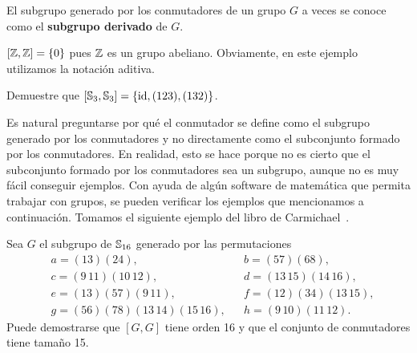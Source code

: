 El subgrupo generado por los conmutadores de un grupo $G$ a veces se conoce como el \textbf{subgrupo derivado} de $G$. 

\begin{example}
	$[\mathbb{Z},\mathbb{Z}]=\{0\}$ pues $\mathbb{Z}$ es un grupo abeliano. Obviamente, en este ejemplo
	utilizamos la notación aditiva. 
\end{example}

\begin{exercise}
	Demuestre que $[\mathbb{S}_3,\mathbb{S}_3]=\{\operatorname{id},(123),(132)\}$. 
\end{exercise}


Es natural preguntarse por qué el conmutador se define como el subgrupo
generado por los conmutadores y no directamente como el subconjunto formado por los conmutadores. En realidad, esto se hace porque no es cierto que el subconjunto formado por los conmutadores sea un subgrupo, aunque no es muy fácil conseguir ejemplos. Con ayuda de algún software de matemática que permita trabajar con grupos, se pueden verificar
los ejemplos que mencionamos a continuación. Tomamos el siguiente ejemplo del libro de Carmichael~\cite{MR0075938}.
	
\begin{example}
	Sea $G$ el subgrupo de $\mathbb{S}_{16}$ generado por 
	las permutaciones
	\begin{align*}
&a = (13)(24),&&
b = (57)(68),\\
&c = (9\,11)(10\,12),&&
d = (13\,15)(14\,16),\\
&e = (13)(57)(9\,11),&&
f = (12)(34)(13\,15),\\
&g = (56)(78)(13\,14)(15\,16),&&
h = (9\,10)(11\,12).
\end{align*}	
	Puede demostrarse que $[G,G]$ tiene orden 16 y que el conjunto de conmutadores tiene tamaño 15. 
\end{example}

